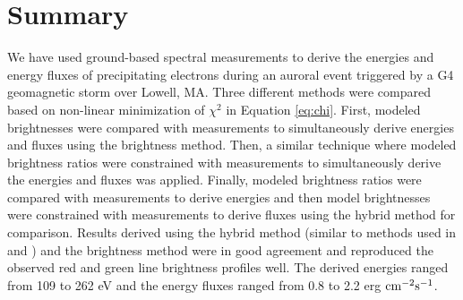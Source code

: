 \section{Summary}
We have used ground-based spectral measurements to derive the energies and energy fluxes of precipitating electrons during an auroral event triggered by a G4 geomagnetic storm over Lowell, MA. Three different methods were compared based on non-linear minimization of $\chi^2$ in Equation \ref{eq:chi}. First, modeled brightnesses were compared with measurements to simultaneously derive energies and fluxes using the brightness method. Then, a similar technique where modeled brightness ratios were constrained with measurements to simultaneously derive the energies and fluxes was applied. Finally, modeled brightness ratios were compared with measurements to derive energies and then model brightnesses were constrained with measurements to derive fluxes using the hybrid method for comparison.  
Results derived using the hybrid method (similar to methods used in \cite{rees_1974} and \cite{pallamraju_2011}) and the brightness method were in good agreement and reproduced the observed red and green line brightness profiles well. The derived energies ranged from 109 to 262 eV and the  energy fluxes ranged from 0.8 to 2.2 erg $\rm cm^{-2} s^{-1}$.
